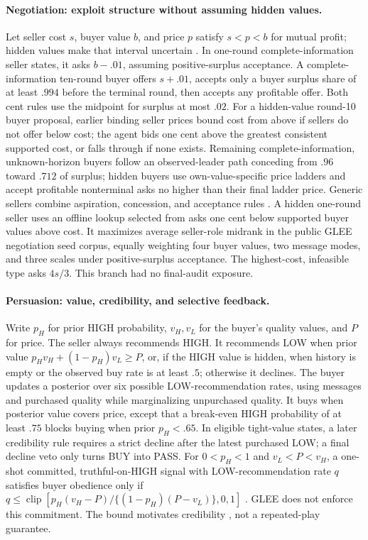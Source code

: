\documentclass{article}
\begin{document}
\paragraph{Negotiation: exploit structure without assuming hidden values.}
Let seller cost $s$, buyer value $b$, and price $p$ satisfy $s<p<b$ for mutual
profit; hidden values make that interval uncertain
\citep{chatterjee1983incomplete,myerson1983bilateral}. In one-round
complete-information seller states, it asks $b-.01$, assuming positive-surplus
acceptance. A complete-information ten-round buyer offers $s+.01$, accepts
only a buyer surplus share of at least $.994$ before the terminal round, then
accepts any profitable offer. Both cent rules use the midpoint for surplus
at most $.02$.
For a hidden-value round-10 buyer proposal, earlier binding seller prices bound
cost from above if sellers do not offer below cost; the agent bids one cent
above the greatest consistent supported cost, or falls through if none exists.
Remaining complete-information, unknown-horizon buyers follow an observed-leader
path conceding from $.96$ toward $.712$ of surplus; hidden buyers use
own-value-specific price ladders and accept profitable nonterminal asks no higher than
their final ladder price. Generic sellers combine aspiration, concession, and
acceptance rules \citep{faratin1998negotiation}. A hidden one-round seller uses an
offline lookup selected from asks one cent below supported buyer values above
cost. It maximizes average seller-role midrank in the public GLEE negotiation
seed corpus, equally weighting four buyer values, two message modes, and three
scales under positive-surplus acceptance. The highest-cost, infeasible type
asks $4s/3$. This branch had no final-audit exposure.

\paragraph{Persuasion: value, credibility, and selective feedback.}
Write $p_H$ for prior HIGH probability, $v_H,v_L$ for the buyer's quality values,
and $P$ for price. The seller always recommends HIGH. It recommends LOW when
prior value $p_Hv_H+(1-p_H)v_L\geq P$, or, if the HIGH value is hidden, when
history is empty or the observed buy rate is at least $.5$; otherwise it declines.
The buyer updates a posterior over six possible LOW-recommendation rates,
using messages and purchased quality while marginalizing unpurchased quality.
It buys when posterior value covers price, except that a break-even HIGH
probability of at least $.75$ blocks buying when prior $p_H<.65$.
In eligible tight-value states, a later credibility rule requires a strict
decline after the latest purchased LOW; a final decline veto only turns BUY
into PASS.
For $0<p_H<1$ and $v_L<P<v_H$, a one-shot committed, truthful-on-HIGH signal
with LOW-recommendation rate $q$ satisfies buyer obedience only if
$q\leq\operatorname{clip}[p_H(v_H-P)/\{(1-p_H)(P-v_L)\},0,1]$
\citep{kamenica2011bayesian}. GLEE does not enforce this commitment. The bound
motivates credibility \citep{sobel1985credibility}, not a repeated-play guarantee.
\end{document}
